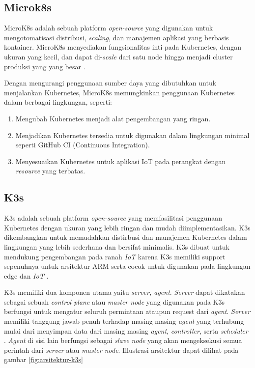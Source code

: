 \subsection{Microk8s}
MicroK8s adalah sebuah platform \textit{open-source} yang digunakan untuk mengotomatisasi distribusi, \textit{scaling}, dan manajemen aplikasi yang berbasis kontainer. MicroK8s menyediakan fungsionalitas inti pada Kubernetes, dengan ukuran yang kecil, dan dapat di-\textit{scale} dari satu node hingga menjadi cluster produksi yang yang besar \parencite{microk8s}.

Dengan mengurangi penggunaan sumber daya yang dibutuhkan untuk menjalankan Kubernetes, MicroK8s memungkinkan penggunaan Kubernetes dalam berbagai lingkungan, seperti:

\begin{enumerate}
  \item Mengubah Kubernetes menjadi alat pengembangan yang ringan.
  \item Menjadikan Kubernetes tersedia untuk digunakan dalam lingkungan minimal seperti GitHub CI (Continuous Integration).
  \item Menyesuaikan Kubernetes untuk aplikasi IoT pada perangkat dengan \textit{resource} yang terbatas.
\end{enumerate}


\subsection{K3s}
K3s adalah sebuah platform \textit{open-source} yang memfasilitasi penggunaan Kubernetes dengan ukuran yang lebih ringan dan mudah diimplementasikan. K3s dikembangkan untuk memudahkan distirbusi dan manajemen Kubernetes dalam lingkungan yang lebih sederhana dan bersifat minimalis. K3s dibuat untuk mendukung pengembangan pada ranah \textit{IoT} karena K3s memiliki support sepenuhnya untuk arsitektur ARM serta cocok untuk digunakan pada lingkungan edge dan \textit{IoT} \parencite{k3s}.

K3s memiliki dua komponen utama yaitu \textit{server, agent}. \textit{Server} dapat dikatakan sebagai sebuah \textit{control plane} atau \textit{master node} yang digunakan pada K3s berfungsi untuk mengatur seluruh permintaan ataupun request dari \textit{agent}. \textit{Server} memiliki tanggung jawab penuh terhadap masing masing \textit{agent} yang terhubung mulai dari menyimpan data dari masing masing \textit{agent}, \textit{controller}, serta \textit{scheduler} \parencite{k3s}. \textit{Agent} di sisi lain berfungsi sebagai \textit{slave node} yang akan mengeksekusi semua perintah dari \textit{server} atau \textit{master node}. Illustrasi arsitektur dapat dilihat pada gambar \ref{fig:arsitektur-k3s}

